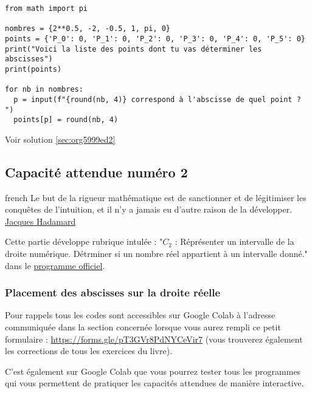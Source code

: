 \documentclass[a4paper, 11pt, twoside]{article}
\begin{document}
\begin{verbatim}
from math import pi

nombres = {2**0.5, -2, -0.5, 1, pi, 0}
points = {'P_0': 0, 'P_1': 0, 'P_2': 0, 'P_3': 0, 'P_4': 0, 'P_5': 0}
print("Voici la liste des points dont tu vas déterminer les abscisses")
print(points)

for nb in nombres:
  p = input(f"{round(nb, 4)} correspond à l'abscisse de quel point ? ")
  points[p] = round(nb, 4)
\end{verbatim}

Voir solution \ref{sec:org5999ed2}
\stopcontents[level-2]

\subsection{Capacité attendue numéro 2}
\label{sec:orga5f1d95}

\begin{foreigndisplayquote}{french}
Le but de la rigueur mathématique est de sanctionner et de
légitimiser les conquêtes de l'intuition, et il n'y a  jamais eu
d'autre raison de la développer.\\

\href{https://fr.wikipedia.org/wiki/Jacques\_Hadamard}{Jacques Hadamard}
\end{foreigndisplayquote}

\startcontents[level-2]

Cette partie développe rubrique intulée : "\(C_2\) : Réprésenter un
intervalle de la droite numérique. Détrminer si un nombre réel
appartient à un intervalle donné." dans le \href{https://eduscol.education.fr/document/24553/download}{programme officiel}.

\subsubsection{Placement des abscisses sur la droite réelle}
\label{sec:org587f803}

Pour rappels tous les codes sont accessibles sur Google Colab à
l'adresse communiquée dans la section concernée lorsque vous
aurez rempli ce petit formulaire :
\url{https://forms.gle/pT3GVr8PdNYCeVir7} (vous trouverez également
les corrections de tous les exercices du livre).

C'est également sur Google Colab que vous pourrez tester tous les
programmes qui vous permettent de pratiquer les capacités attendues
de manière interactive.
\end{document}
